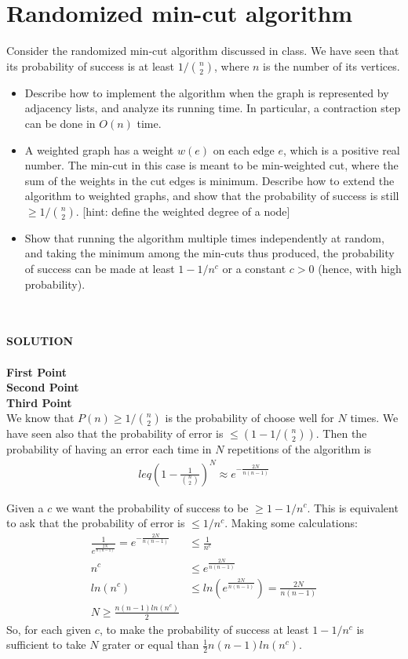 \documentclass[a4paper]{article}
\begin{document}
\section*{Randomized min-cut algorithm}
Consider the randomized min-cut algorithm discussed in class.
We have seen that its probability of success is at least $1 / \binom{n}{2}$, where $n$ is the number of its vertices.
\begin{itemize}
\item Describe how to implement the algorithm when the graph is represented by adjacency lists, and analyze its running time.
In particular, a contraction step can be done in $O(n)$ time.
\item A weighted graph has a weight $w(e)$ on each edge $e$, which  is  a  positive  real number.
The  min-cut  in  this  case  is  meant  to  be  min-weighted  cut,  where  the sum  of  the  weights  in  the  cut  edges  is  minimum.
Describe  how  to  extend  the algorithm  to  weighted  graphs,  and  show  that  the  probability  of  success  is  still $\geq 1/\binom{n}{2}$. [hint: define the weighted degree of a node]
\item Show that running the algorithm multiple times independently at random, and taking the minimum among the min-cuts thus produced, the probability of success can be made at least $1 - 1/n^c$ or a constant $c > 0$ (hence, with high probability).
\end{itemize}
\
\\
\\
\textbf{SOLUTION}
\\
\\

\noindent
\textbf{First Point}
\\

\noindent
\textbf{Second Point}
\\

\noindent
\textbf{Third Point}
\\

We know that $P(n) \geq 1 / \binom{n}{2}$ is the probability of choose well for $N$ times.
We have seen also that the probability of error is $\leq (1 - 1/\binom{n}{2})$.
Then the probability of having an error each time in $N$ repetitions of the algorithm is 
\begin{align*}
leq (1 - \frac{1}{\binom{n}{2}})^N \approx e^{-\frac{2N}{n(n-1)}}
\end{align*}

Given a $c$ we want the probability of success to be $\geq 1 - 1/n^c$.
This is equivalent to ask that the probability of error is $\leq 1/n^c$.
Making some calculations:
\begin{align*}
\frac{1}{e^{\frac{2N}{n(n-1)}}} = e^{-\frac{2N}{n(n-1)}} &\leq \frac{1}{n^c}\\
n^c &\leq e^{\frac{2N}{n(n-1)}}\\
ln(n^c) &\leq ln(e^{\frac{2N}{n(n-1)}}) = \frac{2N}{n(n-1)}\\
N \geq \frac{n(n-1)ln(n^c)}{2}
\end{align*}
So, for each given $c$, to make the probability of success at least $1 - 1/n^c$ is sufficient to take $N$ grater or equal than $\frac{1}{2} n(n-1)ln(n^c)$.
\end{document}
